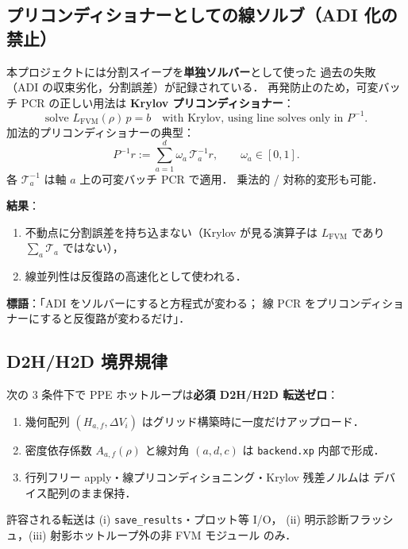 \subsection{プリコンディショナーとしての線ソルブ（ADI 化の禁止）}
\label{sec:gpu_fvm_preconditioner}

本プロジェクトには分割スイープを\textbf{単独ソルバー}として使った
過去の失敗（ADI の収束劣化，分割誤差）が記録されている．
再発防止のため，可変バッチ PCR の正しい用法は
\textbf{Krylov プリコンディショナー}：
\begin{equation}
  \text{solve } L_\text{FVM}(\rho)\,p = b
  \quad\text{with Krylov, using line solves only in }P^{-1}.
  \label{eq:fvm_krylov_with_prec}
\end{equation}
加法的プリコンディショナーの典型：
\begin{equation}
  P^{-1} r := \sum_{a=1}^{d} \omega_a\,\mathcal{T}_a^{-1} r,
  \qquad \omega_a\in[0,1].
  \label{eq:fvm_additive_prec}
\end{equation}
各 $\mathcal{T}_a^{-1}$ は軸 $a$ 上の可変バッチ PCR で適用．
乗法的 / 対称的変形も可能．

\noindent\textbf{結果}：
\begin{enumerate}[noitemsep]
  \item 不動点に分割誤差を持ち込まない（Krylov が見る演算子は
        $L_\text{FVM}$ であり $\sum_a\mathcal{T}_a$ ではない），
  \item 線並列性は反復路の高速化として使われる．
\end{enumerate}
\textbf{標語}：「ADI をソルバーにすると方程式が変わる；
線 PCR をプリコンディショナーにすると反復路が変わるだけ」．

\subsection{D2H/H2D 境界規律}
\label{sec:gpu_fvm_d2h_discipline}
\label{app:gpu_fvm_d2h}%

\begin{tcolorbox}[resultbox,title={ゼロ転送ホットループ条件}]
次の 3 条件下で PPE ホットループは\textbf{必須 D2H/H2D 転送ゼロ}：
\begin{enumerate}[noitemsep]
  \item 幾何配列 $(H_{a,f},\Delta V_i)$ はグリッド構築時に一度だけアップロード．
  \item 密度依存係数 $A_{a,f}(\rho)$ と線対角 $(a,d,c)$ は
        \texttt{backend.xp} 内部で形成．
  \item 行列フリー apply・線プリコンディショニング・Krylov 残差ノルムは
        デバイス配列のまま保持．
\end{enumerate}
\end{tcolorbox}
許容される転送は (i) \texttt{save\_results}・プロット等 I/O，
(ii) 明示診断フラッシュ，(iii) 射影ホットループ外の非 FVM モジュール
のみ．

